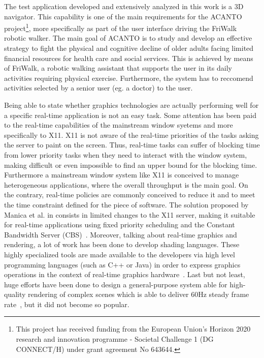 The test application developed and extensively analyzed in this work is a 3D navigator.
This capability is one of the main requirements for the ACANTO~\cite{acanto}
project\footnote{This project has received funding from the European Union’s Horizon
2020 research and innovation programme - Societal Challenge 1 (DG CONNECT/H) under 
grant agreement No 643644.}, more specifically as part of the user interface driving
the FriWalk robotic walker.
The main goal of ACANTO is to study and develop an effective strategy to fight the
physical and cognitive decline of older adults facing limited financial
resources for health care and social services. This is achieved by means of FriWalk,
a robotic walking assistant that supports the user in its daily activities requiring
physical exercise. Furthermore, the system has to reccomend activities selected 
by a senior user (eg. a doctor) to the user.

Being able to state whether graphics technologies are actually performing well for
a specific real-time application is not an easy task.
Some attention has been paid to the real-time capabilities of the mainstream window
syetems and more specifically to X11. X11 is not aware of the real-time priorities
of the tasks asking the server to paint on the screen. Thus, real-time
tasks can suffer of blocking time from lower priority tasks when they need to
interact with the window system, making difficult or even impossible to find an
upper bound for the blocking time. Furthermore a mainstream window system like X11
is conceived to manage heterogeneous applications, where the overall throughput
is the main goal. On the contrary, real-time policies are commonly conceived to
reduce it and to meet the time constraint defined for the piece of software.
The solution proposed by Manica et al. in \cite{manica2008qos} consists in limited
changes to the X11 server, making it suitable for real-time applications using
fixed priority scheduling and the Constant Bandwidth Server
(CBS)~\cite{buttazzo2006optimal}. Moreover, talking about real-time graphics and rendering, a lot of work has been
done to develop shading languages. These highly specialized tools
are made available to the developers via high level programming languages
(such as C++ or Java) in order to express graphics operations in the context
of real-time graphics hardware~\cite{Fernando:2003:CTD:862247}. Last but not least,
huge efforts have been done to design a general-purpose system able for high-quality
rendering of complex scenes which is able to deliver 60Hz steady frame
rate~\cite{Montrym:1997:IRG:258734.258871}, but it did not become so popular.

